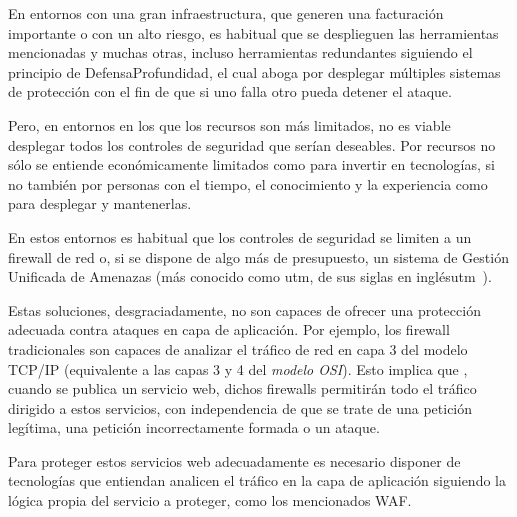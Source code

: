 \par En entornos con una gran infraestructura, que generen una facturación importante o con un alto riesgo, es habitual que se desplieguen las herramientas mencionadas y muchas otras, incluso herramientas redundantes siguiendo el principio de
\gls{DefensaProfundidad},  el cual aboga por desplegar múltiples sistemas de protección con el fin de que si uno falla otro pueda detener el ataque.
\par Pero, en entornos en los que los recursos son más limitados, no es viable desplegar todos los controles de seguridad que serían deseables. Por recursos no sólo se entiende
económicamente limitados como para invertir en tecnologías, si no también por personas con el tiempo, el conocimiento y la experiencia como para desplegar y mantenerlas.
\par En estos entornos es habitual que los controles de seguridad se limiten a un firewall de red o, si se dispone de algo más de presupuesto, un sistema de Gestión Unificada de
Amenazas (más conocido como \acrshort{utm}, de sus siglas en inglés\acrlong{utm}~\cite{wiki:utm}).
\par Estas soluciones, desgraciadamente, no son capaces de ofrecer una protección adecuada contra ataques en capa de aplicación. Por ejemplo, los firewall tradicionales son
capaces de analizar el tráfico de red en capa 3 del modelo TCP/IP (equivalente a las capas 3 y 4 del {\em modelo OSI\cite{osi}}). Esto implica que , cuando se publica un servicio web,
dichos firewalls permitirán todo el tráfico dirigido a estos servicios, con independencia de que se trate de una petición legítima, una petición incorrectamente formada o un ataque.
\par Para proteger estos servicios web adecuadamente es necesario disponer de tecnologías que entiendan analicen el tráfico en la capa de aplicación siguiendo la lógica propia del servicio a proteger, como los mencionados
WAF.

